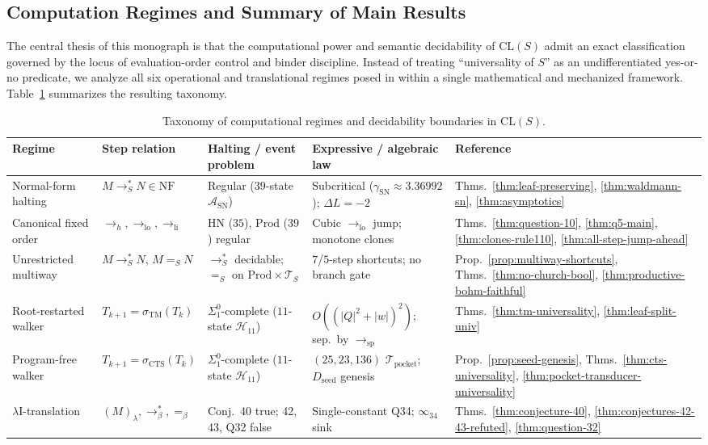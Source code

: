 \documentclass[11pt,reqno]{amsart}
\numberwithin{equation}{section}
\theoremstyle{plain}
\theoremstyle{definition}
\theoremstyle{remark}
\newcommand{\CLS}{\mathrm{CL}(S)}
\newcommand{\TS}{\mathcal{T}_S}
\newcommand{\NF}{\mathrm{NF}}
\newcommand{\SN}{\mathrm{SN}}
\newcommand{\HN}{\mathrm{HN}}
\newcommand{\Prod}{\mathrm{Prod}}
\newcommand{\redSs}{\to_S^*}
\newcommand{\convS}{=_S}
\begin{document}
\subsection{Computation Regimes and Summary of Main Results}\label{subsec:intro-results}

The central thesis of this monograph is that the computational power and semantic decidability of $\CLS$ admit an exact classification governed by the locus of evaluation-order control and binder discipline. Instead of treating ``universality of $S$'' as an undifferentiated yes-or-no predicate, we analyze all six operational and translational regimes posed in \cite{Wolfram2021Challenge,BarendregtEndrullisKlopWaldmann2017} within a single mathematical and mechanized framework. Table~\ref{tab:regimes} summarizes the resulting taxonomy.

\begin{table}[htbp]
\centering
\caption{Taxonomy of computational regimes and decidability boundaries in $\CLS$.}\label{tab:regimes}
\footnotesize
\setlength{\tabcolsep}{3.2pt}
\begin{tabular}{@{}lllll@{}}
\toprule
Regime & Step relation & Halting / event problem & Expressive / algebraic law & Reference \\
\midrule
Normal-form halting & $M \redSs N \in \NF$ & Regular ($39$-state $\mathcal{A}_{\SN}$) & Subcritical ($\gamma_{\SN} \approx 3.36992$); $\Delta L = -2$ & Thms.~\ref{thm:leaf-preserving}, \ref{thm:waldmann-sn}, \ref{thm:asymptotics} \\
Canonical fixed order & $\to_h, \to_{\mathrm{lo}}, \to_{\mathrm{li}}$ & $\HN$ ($35$), $\Prod$ ($39$) regular & Cubic $\to_{\mathrm{lo}}$ jump; monotone clones & Thms.~\ref{thm:question-10}, \ref{thm:q5-main}, \ref{thm:clones-rule110}, \ref{thm:all-step-jump-ahead} \\
Unrestricted multiway & $M \redSs N$, $M \convS N$ & $\redSs$ decidable; $\convS$ on $\Prod \times \TS$ & $7$/$5$-step shortcuts; no branch gate & Prop.~\ref{prop:multiway-shortcuts}, Thms.~\ref{thm:no-church-bool}, \ref{thm:productive-bohm-faithful} \\
Root-restarted walker & $T_{k+1} = \sigma_{\mathrm{TM}}(T_k)$ & $\Sigma_1^0$-complete ($11$-state $\mathcal{H}_{11}$) & $O((|Q|^2{+}|w|)^2)$; sep.\ by $\to_{\mathrm{sp}}$ & Thms.~\ref{thm:tm-universality}, \ref{thm:leaf-split-univ} \\
Program-free walker & $T_{k+1} = \sigma_{\mathrm{CTS}}(T_k)$ & $\Sigma_1^0$-complete ($11$-state $\mathcal{H}_{11}$) & $(25,23,136)$ $\mathcal{T}_{\mathrm{pocket}}$; $D_{\mathrm{seed}}$ genesis & Prop.~\ref{prop:seed-genesis}, Thms.~\ref{thm:cts-universality}, \ref{thm:pocket-transducer-universality} \\
$\lambda\mathrm{I}$-translation & $(M)_\lambda, \to_\beta^*, =_\beta$ & Conj.~40 true; 42, 43, Q32 false & Single-constant Q34; $\infty_{34}$ sink & Thms.~\ref{thm:conjecture-40}, \ref{thm:conjectures-42-43-refuted}, \ref{thm:question-32} \\
\bottomrule
\end{tabular}
\end{table}
\end{document}
